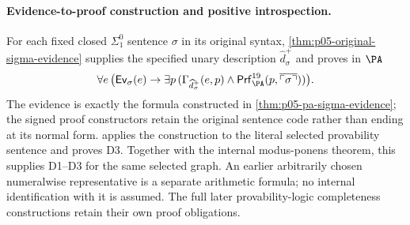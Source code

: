 \paragraph{Evidence-to-proof construction and positive introspection.}
For each fixed closed \(\Sigma^0_1\) sentence \(\sigma\) in its
original syntax, \cref{thm:p05-original-sigma-evidence} supplies the
specified unary description \(\widehat d_\sigma^+\) and proves in
\(\PA\)
\[
 \forall e\,\bigl(\mathsf{Ev}_\sigma(e)\to
    \exists p\,(\Gamma_{\widehat d_\sigma^+}(e,p)\land
       \mathsf{Prf}^{19}_{\PA}(p,\overline{\ulcorner\sigma\urcorner}))\bigr).
\]
The evidence is exactly the formula constructed in
\cref{thm:p05-pa-sigma-evidence}; the signed proof constructors retain
the original sentence code rather than ending at its normal form.
 applies
the construction to the literal selected provability sentence and proves D3.
Together with the internal modus-ponens theorem, this supplies D1--D3
for the same selected graph. An earlier arbitrarily chosen numeralwise
representative is a separate arithmetic formula; no internal identification
with it is assumed. The full later provability-logic completeness
constructions retain their own proof obligations.
